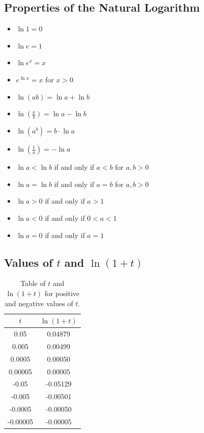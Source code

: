 \subsection{Properties of the Natural Logarithm}
\begin{itemize}
  \item \(\ln 1 = 0\)
  \item \(\ln e = 1\)
  \item \(\ln e^{x} = x\)
  \item \(e^{\ln x} = x\) for \(x > 0\)
  \item \(\ln(ab) = \ln a + \ln b\)
  \item \(\ln\left(\frac{a}{b}\right) = \ln a - \ln b\)
  \item \(\ln(a^{b}) = b \cdot \ln a\)
  \item \(\ln\left(\frac{1}{a}\right) = -\ln a\)
  \item \(\ln a < \ln b\) if and only if \(a < b\) for \(a, b > 0\)
  \item \(\ln a = \ln b\) if and only if \(a = b\) for \(a, b > 0\)
  \item \(\ln a > 0\) if and only if \(a > 1\)
  \item \(\ln a < 0\) if and only if \(0 < a < 1\)
  \item \(\ln a = 0\) if and only if \(a = 1\)
\end{itemize}

\subsection{Values of \(t\) and \(\ln(1+t)\)}
\begin{table}[]
  \centering
  \begin{tabular}{|c|c|}
    \hline
    \(t\) & \(\ln(1+t)\) \\ \hline
    0.05 & 0.04879 \\
    0.005 & 0.00499 \\
    0.0005 & 0.00050 \\
    0.00005 & 0.00005 \\
    -0.05 & -0.05129 \\
    -0.005 & -0.00501 \\
    -0.0005 & -0.00050 \\
    -0.00005 & -0.00005 \\
    \hline
  \end{tabular}
  \caption{Table of \(t\) and \(\ln(1+t)\) for positive and negative values of \(t\).}
\end{table}

